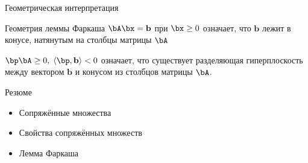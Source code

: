 \documentclass[12pt,russian]{beamer}
\begin{document}
\begin{frame}{Геометрическая интерпретация}
\begin{block}{Геометрия леммы Фаркаша}
$\bA\bx = \mathbf{b}$ при $\bx \geq 0$ означает, что $\mathbf{b}$ лежит в конусе, натянутым на столбцы матрицы $\bA$

$\bp\bA \geq 0, \; \langle \bp, \mathbf{b} \rangle < 0$ означает, что существует разделяющая гиперплоскость между вектором $\mathbf{b}$ и конусом из столбцов матрицы $\bA$.
\end{block}
\end{frame}

\begin{frame}{Резюме}
\begin{itemize}
\item Сопряжённые множества
\item Свойства сопряжённых множеств
\item Лемма Фаркаша
\end{itemize}

\end{frame}
\end{document}
